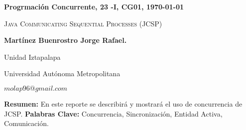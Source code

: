 \documentclass[11pt,twoside]{article}
\date{}
\begin{document}
    \centerline{\bf Progrmación Concurrente, 23 -I, CG01, \today}
    \centerline{}
    \centerline{}
    \begin{center}
    \Large{\textsc{Java Communicating Sequential Processes (JCSP)}}
    \end{center}
    \centerline{}
    \centerline{\bf {Martínez Buenrostro Jorge Rafael.}}
    \centerline{}
    \centerline{Unidad Iztapalapa}
    \centerline{Universidad Autónoma Metropolitana}
    \centerline{$molap96@gmail.com$}
    \newtheorem{Theorem}{\quad Theorem}[section]
    \newtheorem{Definition}[Theorem]{\quad Definition}
    \newtheorem{Corollary}[Theorem]{\quad Corollary}
    \newtheorem{Lemma}[Theorem]{\quad Lemma}
    \newtheorem{Example}[Theorem]{\quad Example}
    \bigskip
    \textbf{Resumen:} En este reporte se describirá y mostrará el uso de concurrencia de JCSP.
    {\bf Palabras Clave:} Concurrencia, Sincronización, Entidad Activa, Comunicación.
    
	
\end{document}
